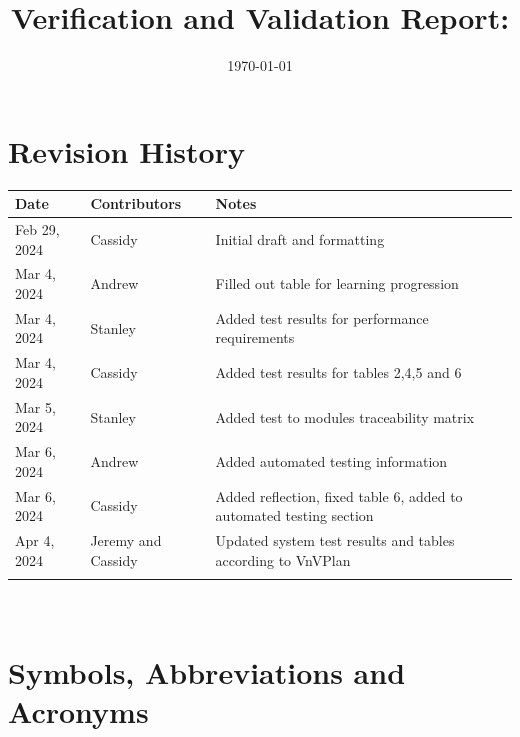 \documentclass[12pt, titlepage]{article}
\begin{document}
\title{Verification and Validation Report: \progname} 
\author{\authname}
\date{\today}
	
\maketitle


\section{Revision History}

\begin{tabularx}{\textwidth}{p{3cm}p{3cm}X}
\toprule {\bf Date} & {\bf Contributors} & {\bf Notes}\\
\midrule
Feb 29, 2024 & Cassidy & Initial draft and formatting\\
Mar 4, 2024 & Andrew & Filled out table for learning progression\\
Mar 4, 2024 & Stanley & Added test results for performance requirements\\
Mar 4, 2024 & Cassidy & Added test results for tables 2,4,5 and 6\\
Mar 5, 2024 & Stanley & Added test to modules traceability matrix\\
Mar 6, 2024 & Andrew & Added automated testing information\\
Mar 6, 2024 & Cassidy & Added reflection, fixed table 6, added to automated testing section\\ 
Apr 4, 2024 & Jeremy and Cassidy & Updated system test results and tables according to VnVPlan\\ 
 &  & \\
\bottomrule
\end{tabularx}

~\newpage

\section{Symbols, Abbreviations and Acronyms}
\end{document}
